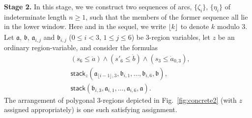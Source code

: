 \documentclass{article}
\newcommand{\set}[1]{\{#1\}}
\newcommand{\tseq}[1]{\mathfrak{#1}}
\newcommand{\intermediate}[1]{\dot{#1}}
\newcommand{\inner}[1]{\ddot{#1}}
\newcommand{\stack}{\mathsf{stack}}
\newcommand{\md}[2][] {{\lfloor#2\rfloor_{#1}}}
\begin{document}
\noindent
\textbf{Stage 2.}  In this stage, we we construct two sequences of
arcs, $\set{\zeta_i}$, $\set{\eta_i}$ of indeterminate length $n \geq
1$, such that the members of the former sequence all lie in the lower
window. Here and in the sequel, we write $\md{k}$ to denote $k$ modulo
3.  Let $\tseq{a}$, $\tseq{b}$, $\tseq{a}_{i,j}$ and $\tseq{b}_{i,j}$
($0 \leq i < 3$, $1 \leq j \leq 6$) be 3-region variables, let $z$ be
an ordinary region-variable, and consider the formulas
\begin{align}
\label{eq:aSeq1}
& (s_6 \leq \inner{a}) \wedge (s'_6 \leq \inner{b})
\wedge (s_3 \leq \intermediate{a}_{0,3}), \\
\label{eq:aSeq:b}
& \stack_z(\tseq{a}_{\md{i-1},3}, \tseq{b}_{i,1}, \ldots, \tseq{b}_{i,6}, \tseq{b}),\\
\label{eq:aSeq:a}
& \stack(\tseq{b}_{i,3}, \tseq{a}_{i,1}, \ldots, \tseq{a}_{i,6}, \tseq{a}).
\end{align}
The arrangement of polygonal 3-regions depicted in
Fig.~\ref{fig:concrete2} (with $z$ assigned appropriately) is one such
satisfying assignment.
\end{document}
